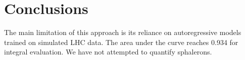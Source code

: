 \section{Conclusions}\label{sec:conclusions}

The main limitation of this approach is its reliance on autoregressive
models trained on simulated LHC data. The area under the curve reaches
0.934 for integral evaluation. We have not attempted to quantify
sphalerons.

